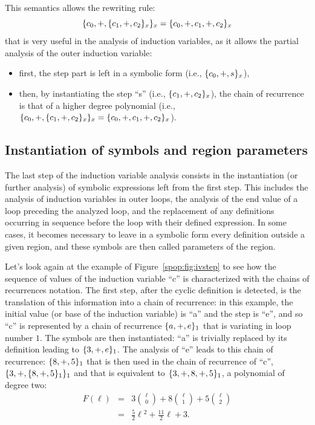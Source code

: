 This semantics allows the rewriting rule:
\begin{equation*}
  \{c_0, +, \{c_1, +, c_2\}_x\}_x = \{c_0, +, c_1, +, c_2\}_x
\end{equation*}
that is very useful in the analysis of induction variables, as it
allows the partial analysis of the outer induction variable:
\begin{itemize}
\item first, the step part is left in a symbolic form (i.e.,
  $\{c_0, +, s\}_x$),
\item then, by instantiating the step ``s'' (i.e.,
  $\{c_1, +, c_2\}_x$), the chain of recurrence is that of a higher degree
  polynomial (i.e., $\{c_0, +, \{c_1, +, c_2\}_x\}_x = \{c_0, +, c_1, +, c_2\}_x$).
\end{itemize}

\subsection{Instantiation of symbols and region parameters}

The last step of the induction variable analysis consists in the
instantiation (or further analysis) of symbolic expressions left from
the first step.  This includes the analysis of induction variables in
outer loops, the analysis of the end value of a loop preceding the
analyzed loop, and the replacement of any definitions occurring in
sequence before the loop with their defined expression.  In some
cases, it becomes necessary to leave in a symbolic form every
definition outside a given region, and these symbols are then called
parameters of the region.

Let's look again at the example of Figure~\ref{spop:fig:ivstep} to see
how the sequence of values of the induction variable ``c'' is
characterized with the chains of recurrences notation.  The first
step, after the cyclic definition is detected, is the translation of
this information into a chain of recurrence: in this example, the
initial value (or base of the induction variable) is ``a'' and the
step is ``e'', and so ``c'' is represented by a chain of recurrence
$\{a, +, e\}_1$ that is variating in loop number $1$.  The symbols
are then instantiated: ``a'' is trivially replaced by its definition
leading to $\{3, +, e\}_1$.  The analysis of ``e'' leads to this
chain of recurrence: $\{8, +, 5\}_1$ that is then used in the
chain of recurrence of ``c'', $\{3, +, \{8, +, 5\}_1\}_1$ and
that is equivalent to $\{3, +, 8, +, 5\}_1$, a polynomial of
degree two:
\begin{eqnarray*}
  F(\ell)
  &=& 3\binom{\ell}{0} + 8\binom{\ell}{1} + 5\binom{\ell}{2} \\
  &=& \frac{5}{2}\ell{}^2+\frac{11}{2}\ell + 3.
\end{eqnarray*}

